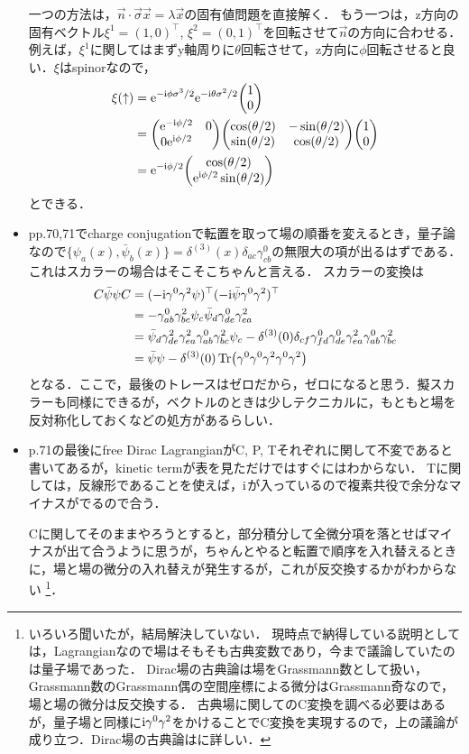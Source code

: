 \begin{itemize}
		一つの方法は，$\vec{n}\cdot \vec{\sigma} \vec{x}=\lambda\vec{x} $の固有値問題を直接解く．
		もう一つは，z方向の固有ベクトル$\xi^1=(1, 0)^{\top}$, $\xi^2 = (0, 1)^{\top}$を回転させて$\vec{n}$の方向に合わせる．
		例えば，$\xi^1$に関してはまずy軸周りに$\theta$回転させて，z方向に$\phi$回転させると良い．$\xi$はspinorなので，
		\begin{align}
			\xi(\uparrow) &= \e^{-\i\phi\sigma^3/2}\e^{-\i\theta\sigma^2/2}\mqty(1\\0) \\
						  &= \mqty(\e^{-\i\phi/2} & 0\\ 0 \e^{\i\phi/2})\mqty(\cos(\theta/2) & -\sin(\theta/2) \\ \sin(\theta/2) & \cos(\theta/2))\mqty(1 \\0) \\
						  & = \e^{-\i\phi/2}\mqty(\cos(\theta/2) \\ \e^{\i\phi/2}\sin(\theta/2))
		\end{align}
		とできる．
	\item pp.70,71でcharge conjugationで転置を取って場の順番を変えるとき，量子論なので$\{\psi_a(x), \bar{\psi}_b(x)\} = \delta^{(3)}(x)\delta_{ac}\gamma^0_{cb}$の無限大の項が出るはずである．これはスカラーの場合はそこそこちゃんと言える\cite[p53]{Kugo1989}．
		スカラーの変換は
		\begin{align}
			C\bar{\psi}\psi C&= (-\mathrm{i}\gamma^0\gamma^2\psi)^{\top}(-\mathrm{i}\bar{\psi}\gamma^0\gamma^2)^{\top}\\
							 &= -\gamma_{ab}^{0}\gamma_{bc}^2\psi_c\bar{\psi}_d\gamma_{de}^0\gamma_{ea}^2\\
							 &= \bar{\psi}_d\gamma_{de}^2\gamma_{ea}^2\gamma_{ab}^0\gamma_{bc}^2\psi_c - \delta^{(3)}(0)\delta_{cf}\gamma_{fd}^0\gamma_{de}^0\gamma_{ea}^2\gamma_{ab}^0\gamma_{bc}^2\\
							 &= \bar{\psi}\psi - \delta^{(3)}(0)\Tr(\gamma^0\gamma^0\gamma^2\gamma^0\gamma^2)
		\end{align}
		となる．ここで，最後のトレースはゼロだから，ゼロになると思う．擬スカラーも同様にできるが，ベクトルのときは少しテクニカルに，もともと場を反対称化しておくなどの処方があるらしい．
	\item p.71の最後にfree Dirac LagrangianがC, P, Tそれぞれに関して不変であると書いてあるが，kinetic termが表を見ただけではすぐにはわからない．
		Tに関しては，反線形であることを使えば，$\mathrm{i}$が入っているので複素共役で余分なマイナスがでるので合う．

		Cに関してそのままやろうとすると，部分積分して全微分項を落とせばマイナスが出て合うように思うが，ちゃんとやると転置で順序を入れ替えるときに，場と場の微分の入れ替えが発生するが，これが反交換するかがわからない
		\footnote{いろいろ聞いたが，結局解決していない．
		現時点で納得している説明としては，Lagrangianなので場はそもそも古典変数であり，今まで議論していたのは量子場であった．
	Dirac場の古典論は場をGrassmann数として扱い，Grassmann数のGrassmann偶の空間座標による微分はGrassmann奇なので，場と場の微分は反交換する．
古典場に関してのC変換を調べる必要はあるが，量子場と同様に$\mathrm{i}\gamma^0\gamma^2$をかけることでC変換を実現するので，上の議論が成り立つ．Dirac場の古典論は\cite[Chap.1]{Kugo1989}に詳しい．}．
\end{itemize}
